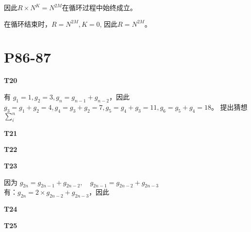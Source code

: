 \documentclass{article}
\begin{document}
因此$R \times N^K = N^{2M}$在循环过程中始终成立。

在循环结束时，$R = N^{2M}, K = 0$, 因此$R = N^{2M}$。

\section{P86-87}

\textbf{T20}

有 $g_1 = 1, g_2 = 3, g_n = g_{n - 1} + g_{n - 2}$，因此 $g_3 = g_1 + g_2 = 4, g_4 = g_3 + g_2 = 7, g_5 = g_4 + g_3 = 11, g_6 = g_5 + g_4 = 18$。
提出猜想$\sum_{i}^{n}$

\vspace{10pt}

\textbf{T21}

\vspace{10pt}

\textbf{T22}

\vspace{10pt}

\textbf{T23}

因为 $g_{2n} = g_{2n - 1} + g_{2n - 2}, \quad g_{2n - 1} = g_{2n - 2} + g_{2n - 3}$\\
有：$g_{2n} = 2 \times g_{2n - 2} + g_{2n - 3}$，因此

\vspace{10pt}

\textbf{T24}

\vspace{10pt}

\textbf{T25}
\end{document}
